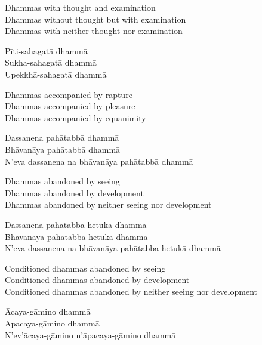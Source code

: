 \begin{english-verses}
  Dhammas with thought and examination\\
  Dhammas without thought but with examination\\
  Dhammas with neither thought nor examination
\end{english-verses}

\begin{pali-hang-continued}
  Pīti-sahagatā dhammā\\
  Sukha-sahagatā dhammā\\
  Upekkhā-sahagatā dhammā
\end{pali-hang-continued}

\begin{english-verses}
  Dhammas accompanied by rapture\\
  Dhammas accompanied by pleasure\\
  Dhammas accompanied by equanimity
\end{english-verses}

\begin{pali-hang-continued}
  Dassanena pahātabbā dhammā\\
  Bhāvanāya pahātabbā dhammā\\
  N'eva dassanena na bhāvanāya pahātabbā dhammā
\end{pali-hang-continued}

\begin{english-verses}
  Dhammas abandoned by seeing\\
  Dhammas abandoned by development\\
  Dhammas abandoned by neither seeing nor development
\end{english-verses}

\begin{pali-hang-continued}
  Dassanena pahātabba-hetukā dhammā\\
  Bhāvanāya pahātabba-hetukā dhammā\\
  N'eva dassanena na bhāvanāya pahātabba-hetukā dhammā
\end{pali-hang-continued}

\begin{english-verses}
  Conditioned dhammas abandoned by seeing\\
  Conditioned dhammas abandoned by development\\
  Conditioned dhammas abandoned by neither seeing nor development
\end{english-verses}

\begin{pali-hang-continued}
  Ācaya-gāmino dhammā\\
  Apacaya-gāmino dhammā\\
  N'ev'ācaya-gāmino n'āpacaya-gāmino dhammā
\end{pali-hang-continued}

